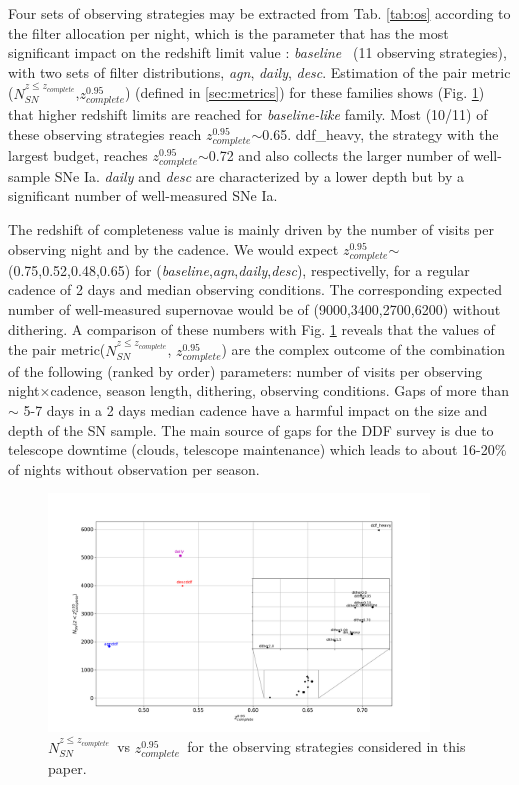 \documentclass[\docopts]{\docclass}
\newcommand{\sne}{{SNe Ia}}
\newcommand{\nsncomp}{{$N_{SN}^{z\leq z_{complete}}$}}
\newcommand{\zcompb}{\mbox{$z_{complete}^{0.95}$}}
\newcommand{\osfamily}[1]{{\it #1}}
\begin{document}

%
%
%
Four sets of observing strategies may be extracted from Tab. \ref{tab:os} according to the filter allocation per night, which is the parameter that has the most significant impact on the redshift limit value : \osfamily{baseline}~ (11 observing strategies), with two sets of filter distributions, \osfamily{agn}, \osfamily{daily}, \osfamily{desc}. Estimation of the pair metric (\nsncomp,\zcompb) (defined in \ref{sec:metrics}) for these families shows (Fig. \ref{fig:nsn_zlim_zoom}) that higher redshift limits are reached for \osfamily{baseline-like} family. Most (10/11) of these observing strategies reach \zcompb$\sim$0.65. ddf\_heavy, the strategy with the largest budget, reaches \zcompb$\sim$0.72 and also collects the larger number of well-sample \sne. \osfamily{daily} and \osfamily{desc} are characterized by a lower depth but by a significant number of well-measured \sne.\par
The redshift of completeness value is mainly driven by the number of visits per observing night and by the cadence. We would expect \zcompb$\sim$(0.75,0.52,0.48,0.65) for (\osfamily{baseline},\osfamily{agn},\osfamily{daily},\osfamily{desc}), respectivelly, for a regular cadence of 2 days and median observing conditions. The corresponding expected number of well-measured supernovae would be of (9000,3400,2700,6200) without dithering. A comparison of these numbers with Fig. \ref{fig:nsn_zlim_zoom} reveals that the values of the pair metric(\nsncomp, \zcompb) are the complex outcome of the combination of the following (ranked by order) parameters: number of visits per observing night$\times$cadence, season length, dithering, observing conditions. Gaps of more than $\sim$ 5-7 days in a 2 days median cadence have a harmful
impact on the size and depth of the SN sample. The main source of gaps for the DDF survey is due to telescope downtime (clouds, telescope maintenance) which leads to about 16-20$\%$ of nights without observation per season.  

\begin{figure}[htbp]
\begin{center}
  \includegraphics[width=0.9\textwidth]{nsn_zlim_zoom.png}
 \caption{\nsncomp~vs \zcompb~for the observing strategies considered in this paper.}\label{fig:nsn_zlim_zoom}
\end{center}
\end{figure}
\end{document}
